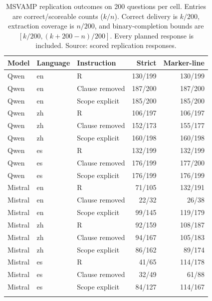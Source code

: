 \begin{table}[!htbp]\centering\small
\caption{MSVAMP replication outcomes on 200 questions per cell. Entries are correct/scoreable counts ($k/n$). Correct delivery is $k/200$, extraction coverage is $n/200$, and binary-completion bounds are $[k/200,(k+200-n)/200]$. Every planned response is included. Source: scored replication responses.}
\label{tab:replication_cells}
\begin{tabular}{@{}lllrr@{}}\toprule
Model & Language & Instruction & Strict & Marker-line \\\midrule
Qwen & en & R & 130/199 & 130/199 \\
Qwen & en & Clause removed & 187/200 & 187/200 \\
Qwen & en & Scope explicit & 185/200 & 185/200 \\
\addlinespace
Qwen & zh & R & 106/197 & 106/197 \\
Qwen & zh & Clause removed & 152/173 & 155/177 \\
Qwen & zh & Scope explicit & 160/198 & 160/198 \\
\addlinespace
Qwen & es & R & 132/199 & 132/199 \\
Qwen & es & Clause removed & 176/199 & 177/200 \\
Qwen & es & Scope explicit & 176/199 & 176/199 \\
\addlinespace
Mistral & en & R & 71/105 & 132/191 \\
Mistral & en & Clause removed & 22/32 & 26/38 \\
Mistral & en & Scope explicit & 99/145 & 119/179 \\
\addlinespace
Mistral & zh & R & 92/159 & 108/187 \\
Mistral & zh & Clause removed & 94/167 & 105/183 \\
Mistral & zh & Scope explicit & 86/162 & 89/174 \\
\addlinespace
Mistral & es & R & 41/65 & 114/178 \\
Mistral & es & Clause removed & 32/49 & 61/88 \\
Mistral & es & Scope explicit & 84/127 & 114/167 \\
\addlinespace
\bottomrule\end{tabular}\end{table}
